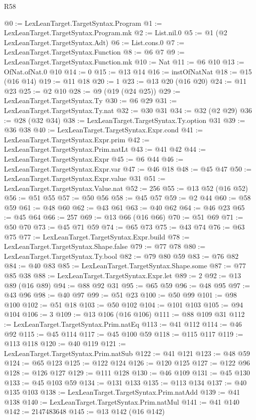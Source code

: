 \begin{lexlean}{R58}
\begin{coremodule}
@0 := LexLeanTarget.TargetSyntax.Program
@1 := LexLeanTarget.TargetSyntax.Program.mk
@2 := List.nil.{0}
@5 := @1 (@2 LexLeanTarget.TargetSyntax.Adt)
@6 := List.cons.{0}
@7 := LexLeanTarget.TargetSyntax.Function
@8 := @6 @7
@9 := LexLeanTarget.TargetSyntax.Function.mk
@10 := Nat
@11 := @6 @10
@13 := OfNat.ofNat.{0} @10
@14 := 0
@15 := @13 @14
@16 := instOfNatNat
@18 := @15 (@16 @14)
@19 := @11 @18
@20 := 1
@23 := @13 @20 (@16 @20)
@24 := @11 @23
@25 := @2 @10
@28 := @9 (@19 (@24 @25))
@29 := LexLeanTarget.TargetSyntax.Ty
@30 := @6 @29
@31 := LexLeanTarget.TargetSyntax.Ty.nat
@32 := @30 @31
@34 := @32 (@2 @29)
@36 := @28 (@32 @34)
@38 := LexLeanTarget.TargetSyntax.Ty.option @31
@39 := @36 @38
@40 := LexLeanTarget.TargetSyntax.Expr.cond
@41 := LexLeanTarget.TargetSyntax.Expr.prim
@42 := LexLeanTarget.TargetSyntax.Prim.natLt
@43 := @41 @42
@44 := LexLeanTarget.TargetSyntax.Expr
@45 := @6 @44
@46 := LexLeanTarget.TargetSyntax.Expr.var
@47 := @46 @18
@48 := @45 @47
@50 := LexLeanTarget.TargetSyntax.Expr.value @31
@51 := LexLeanTarget.TargetSyntax.Value.nat
@52 := 256
@55 := @13 @52 (@16 @52)
@56 := @51 @55
@57 := @50 @56
@58 := @45 @57
@59 := @2 @44
@60 := @58 @59
@61 := @48 @60
@62 := @43 @61
@63 := @40 @62
@64 := @46 @23
@65 := @45 @64
@66 := 257
@69 := @13 @66 (@16 @66)
@70 := @51 @69
@71 := @50 @70
@73 := @45 @71 @59
@74 := @65 @73
@75 := @43 @74
@76 := @63 @75
@77 := LexLeanTarget.TargetSyntax.Expr.build
@78 := LexLeanTarget.TargetSyntax.Shape.false
@79 := @77 @78
@80 := LexLeanTarget.TargetSyntax.Ty.bool
@82 := @79 @80 @59
@83 := @76 @82
@84 := @40 @83
@85 := LexLeanTarget.TargetSyntax.Shape.some
@87 := @77 @85 @38
@88 := LexLeanTarget.TargetSyntax.Expr.let
@89 := 2
@92 := @13 @89 (@16 @89)
@94 := @88 @92 @31
@95 := @65 @59
@96 := @48 @95
@97 := @43 @96
@98 := @40 @97
@99 := @51 @23
@100 := @50 @99
@101 := @98 @100
@102 := @51 @18
@103 := @50 @102
@104 := @101 @103
@105 := @94 @104
@106 := 3
@109 := @13 @106 (@16 @106)
@111 := @88 @109 @31
@112 := LexLeanTarget.TargetSyntax.Prim.natEq
@113 := @41 @112
@114 := @46 @92
@115 := @45 @114
@117 := @45 @100 @59
@118 := @115 @117
@119 := @113 @118
@120 := @40 @119
@121 := LexLeanTarget.TargetSyntax.Prim.natSub
@122 := @41 @121
@123 := @48 @59
@124 := @65 @123
@125 := @122 @124
@126 := @120 @125
@127 := @122 @96
@128 := @126 @127
@129 := @111 @128
@130 := @46 @109
@131 := @45 @130
@133 := @45 @103 @59
@134 := @131 @133
@135 := @113 @134
@137 := @40 @135 @103
@138 := LexLeanTarget.TargetSyntax.Prim.natAdd
@139 := @41 @138
@140 := LexLeanTarget.TargetSyntax.Prim.natMul
@141 := @41 @140
@142 := 2147483648
@145 := @13 @142 (@16 @142)

\end{coremodule}
\end{lexlean}
